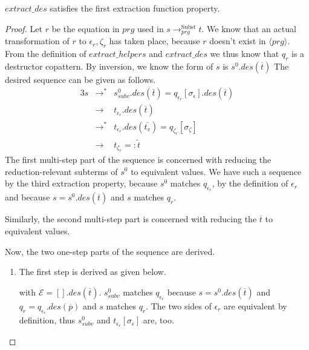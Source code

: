 \begin{lemma}

$extract\_des$ satisfies the first extraction function property.

\begin{proof}

Let $r$ be the equation in $prg$ used in $s \longrightarrow^{\textrm{Subst}}_{prg} t$. We know that an actual transformation of $r$ to $\epsilon_r, \zeta_r$ has taken place, because $r$ doesn't exist in $\langle prg \rangle$. From the definition of $extract\_helpers$ and $extract\_des$ we thus know that $q_r$ is a destructor copattern. By inversion, we know the form of $s$ is $s^0.des(\overline{t})$ The desired sequence can be given as follows.
\begin{alignat*}{3}
s &\longrightarrow^* &s^0_{subv}.des(\overline{t}) = q_{\epsilon_r}[\sigma_\epsilon].des(\overline{t})\\
&\longrightarrow &t_{\epsilon_r}.des(\overline{t})\\
&\longrightarrow^*  &t_{\epsilon_r}.des(\overline{t_v}) = q_{\zeta_r}[\sigma_\zeta]\\
&\longrightarrow &t_{\zeta_r} =: \widetilde{t}
\end{alignat*}
The first multi-step part of the sequence is concerned with reducing the reduction-relevant subterms of $s^0$ to equivalent values. We have such a sequence by the third extraction property, because $s^0$ matches $q_{\epsilon_r}$, by the definition of $\epsilon_r$ and because $s = s^0.des(\overline{t})$ and $s$ matches $q_r$.

Similarly, the second multi-step part is concerned with reducing the $\overline{t}$ to equivalent values.

Now, the two one-step parts of the sequence are derived.
\begin{enumerate}
\item The first step is derived as given below.
\begin{prooftree}
\end{prooftree}
with $\mathcal{E} = [].des(\overline{t})$. $s^0_{subv}$ matches $q_{\epsilon_r}$ because $s = s^0.des(\overline{t})$ and $q_r = q_{\epsilon_r}.des(\overline{p})$ and $s$ matches $q_r$. The two sides of $\epsilon_r$ are equivalent by definition, thus $s^0_{subv}$ and $t_{\epsilon_r}[\sigma_\epsilon]$ are, too.


\end{enumerate}
\end{proof}
\end{lemma}

